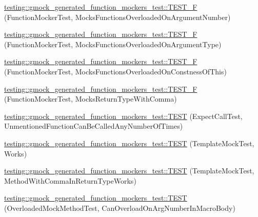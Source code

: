 \begin{DoxyCompactItemize}
\item 
\mbox{\hyperlink{namespacetesting_1_1gmock__generated__function__mockers__test_a23b4f6d7bf9f6b35126ee137aa48ae3b}{testing\+::gmock\+\_\+generated\+\_\+function\+\_\+mockers\+\_\+test\+::\+T\+E\+S\+T\+\_\+F}} (Function\+Mocker\+Test, Mocks\+Functions\+Overloaded\+On\+Argument\+Number)
\item 
\mbox{\hyperlink{namespacetesting_1_1gmock__generated__function__mockers__test_a6fb9a5901e2d2066a9fe5a3d05c0cbe1}{testing\+::gmock\+\_\+generated\+\_\+function\+\_\+mockers\+\_\+test\+::\+T\+E\+S\+T\+\_\+F}} (Function\+Mocker\+Test, Mocks\+Functions\+Overloaded\+On\+Argument\+Type)
\item 
\mbox{\hyperlink{namespacetesting_1_1gmock__generated__function__mockers__test_ad580a4b2f97b3c2643794a627b347511}{testing\+::gmock\+\_\+generated\+\_\+function\+\_\+mockers\+\_\+test\+::\+T\+E\+S\+T\+\_\+F}} (Function\+Mocker\+Test, Mocks\+Functions\+Overloaded\+On\+Constness\+Of\+This)
\item 
\mbox{\hyperlink{namespacetesting_1_1gmock__generated__function__mockers__test_abb74ac8e211661c0d87c902f87002e6d}{testing\+::gmock\+\_\+generated\+\_\+function\+\_\+mockers\+\_\+test\+::\+T\+E\+S\+T\+\_\+F}} (Function\+Mocker\+Test, Mocks\+Return\+Type\+With\+Comma)
\item 
\mbox{\hyperlink{namespacetesting_1_1gmock__generated__function__mockers__test_ae0d5aa8e715f3c183f1ccdcf390187e7}{testing\+::gmock\+\_\+generated\+\_\+function\+\_\+mockers\+\_\+test\+::\+T\+E\+ST}} (Expect\+Call\+Test, Unmentioned\+Function\+Can\+Be\+Called\+Any\+Number\+Of\+Times)
\item 
\mbox{\hyperlink{namespacetesting_1_1gmock__generated__function__mockers__test_a5f59a7b507101fc0dbb558c090974f02}{testing\+::gmock\+\_\+generated\+\_\+function\+\_\+mockers\+\_\+test\+::\+T\+E\+ST}} (Template\+Mock\+Test, Works)
\item 
\mbox{\hyperlink{namespacetesting_1_1gmock__generated__function__mockers__test_aa998c7e5e8b6fd378cacb53663e8c4a6}{testing\+::gmock\+\_\+generated\+\_\+function\+\_\+mockers\+\_\+test\+::\+T\+E\+ST}} (Template\+Mock\+Test, Method\+With\+Comma\+In\+Return\+Type\+Works)
\item 
\mbox{\hyperlink{namespacetesting_1_1gmock__generated__function__mockers__test_a6542d3ae3f153907c32f3cf15a2ff6cf}{testing\+::gmock\+\_\+generated\+\_\+function\+\_\+mockers\+\_\+test\+::\+T\+E\+ST}} (Overloaded\+Mock\+Method\+Test, Can\+Overload\+On\+Arg\+Number\+In\+Macro\+Body)
\item 

\end{DoxyCompactItemize}
